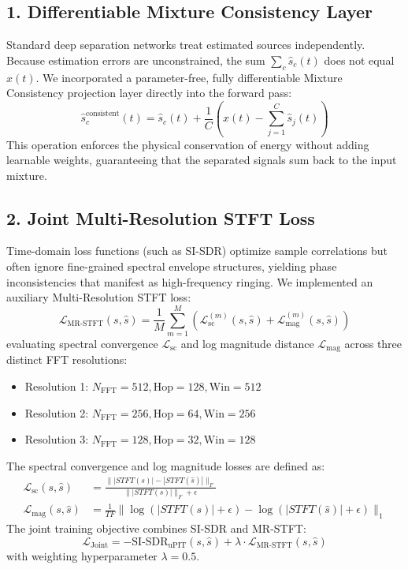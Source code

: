 \documentclass[11pt,a4paper]{report}
\begin{document}
\subsection{1. Differentiable Mixture Consistency Layer}
Standard deep separation networks treat estimated sources independently. Because estimation errors are unconstrained, the sum $\sum_c \hat{s}_c(t)$ does not equal $x(t)$. We incorporated a parameter-free, fully differentiable Mixture Consistency projection layer \cite{wisdom2019differentiable} directly into the forward pass:
\begin{equation}
    \hat{s}_c^{\text{consistent}}(t) = \hat{s}_c(t) + \frac{1}{C} \left( x(t) - \sum_{j=1}^C \hat{s}_j(t) \right)
\end{equation}
This operation enforces the physical conservation of energy without adding learnable weights, guaranteeing that the separated signals sum back to the input mixture.

\subsection{2. Joint Multi-Resolution STFT Loss}
Time-domain loss functions (such as SI-SDR) optimize sample correlations but often ignore fine-grained spectral envelope structures, yielding phase inconsistencies that manifest as high-frequency ringing. We implemented an auxiliary Multi-Resolution STFT loss:
\begin{equation}
    \mathcal{L}_{\text{MR-STFT}}(s, \hat{s}) = \frac{1}{M} \sum_{m=1}^M \left( \mathcal{L}_{\text{sc}}^{(m)}(s, \hat{s}) + \mathcal{L}_{\text{mag}}^{(m)}(s, \hat{s}) \right)
    \label{eq:mr_stft}
\end{equation}
evaluating spectral convergence $\mathcal{L}_{\text{sc}}$ and log magnitude distance $\mathcal{L}_{\text{mag}}$ across three distinct FFT resolutions:
\begin{itemize}
    \item Resolution 1: $N_{\text{FFT}} = 512, \text{Hop} = 128, \text{Win} = 512$
    \item Resolution 2: $N_{\text{FFT}} = 256, \text{Hop} = 64, \text{Win} = 256$
    \item Resolution 3: $N_{\text{FFT}} = 128, \text{Hop} = 32, \text{Win} = 128$
\end{itemize}
The spectral convergence and log magnitude losses are defined as:
\begin{align}
    \mathcal{L}_{\text{sc}}(s, \hat{s}) &= \frac{\| |STFT(s)| - |STFT(\hat{s})| \|_F}{\| |STFT(s)| \|_F + \epsilon} \\
    \mathcal{L}_{\text{mag}}(s, \hat{s}) &= \frac{1}{TF} \| \log(|STFT(s)| + \epsilon) - \log(|STFT(\hat{s})| + \epsilon) \|_1
\end{align}
The joint training objective combines SI-SDR and MR-STFT:
\begin{equation}
    \mathcal{L}_{\text{Joint}} = -\text{SI-SDR}_{\text{uPIT}}(s, \hat{s}) + \lambda \cdot \mathcal{L}_{\text{MR-STFT}}(s, \hat{s})
\end{equation}
with weighting hyperparameter $\lambda = 0.5$.
\end{document}
